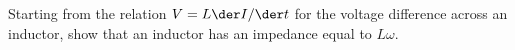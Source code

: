         Starting from the relation $V=L\der I/\der t$ for the
        voltage difference across an inductor, show that an inductor
        has an impedance equal to $L\omega$.
